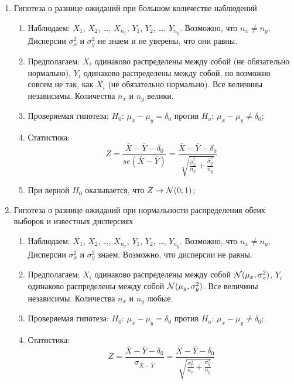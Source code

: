 \documentclass[12pt, a4paper]{article}
\begin{document}
\begin{enumerate}[resume]
  \item Гипотеза о разнице ожиданий при большом количестве наблюдений
    \begin{enumerate}
      \item Наблюдаем: $X_1$, $X_2$, \ldots, $X_{n_x}$, $Y_1$, $Y_2$, \ldots, $Y_{n_y}$.
	Возможно, что $n_x \neq n_y$. Дисперсии $\sigma^2_x$ и $\sigma^2_y$ не знаем и не уверены, что они равны.
      \item Предполагаем: $X_i$ одинаково распределены между собой (не обязательно нормально),
	$Y_i$ одинаково распределены между собой, но возможно совсем не так, как $X_i$ (не обязательно нормально).
	Все величины независимы. Количества $n_x$ и $n_y$ велики.
      \item Проверяемая гипотеза: $H_0$: $\mu_x - \mu_y = \delta_0$ против $H_a$: $\mu_x - \mu_y \neq \delta_0$;

     \item Статистика:
	\[
	  Z = \frac{\bar X - \bar Y - \delta_0}{se(\bar X - \bar Y)} =
	  \frac{\bar X - \bar Y - \delta_0}{\sqrt{\frac{\hat \sigma^2_x}{n_x}+\frac{\hat\sigma^2_y}{n_y}}}
      \]

    \item При верной $H_0$ оказывается, что $Z \to \mathcal{N}(0;1)$;
\end{enumerate}

  \item Гипотеза о разнице ожиданий при нормальности распределения обеих выборок и известных дисперсиях
    \begin{enumerate}
      \item Наблюдаем: $X_1$, $X_2$, \ldots, $X_{n_x}$, $Y_1$, $Y_2$, \ldots, $Y_{n_y}$.
	Возможно, что $n_x \neq n_y$. Дисперсии $\sigma^2_x$ и $\sigma^2_y$ знаем. Возможно, что дисперсии не равны.
      \item Предполагаем: $X_i$ одинаково распределены между собой $\mathcal{N}(\mu_x, \sigma^2_x)$,
	$Y_i$ одинаково распределены между собой $\mathcal{N}(\mu_y, \sigma^2_y)$.
	Все величины независимы. Количества $n_x$ и $n_y$ любые.
      \item Проверяемая гипотеза: $H_0$: $\mu_x - \mu_y = \delta_0$ против $H_a$: $\mu_x - \mu_y \neq \delta_0$;

     \item Статистика:
	\[
	  Z = \frac{\bar X - \bar Y - \delta_0}{\sigma_{\bar X - \bar Y}} =
	  \frac{\bar X - \bar Y - \delta_0}{\sqrt{\frac{\sigma^2_x}{n_x}+\frac{\sigma^2_y}{n_y}}}
      \]


\end{enumerate}
\end{enumerate}
\end{document}
